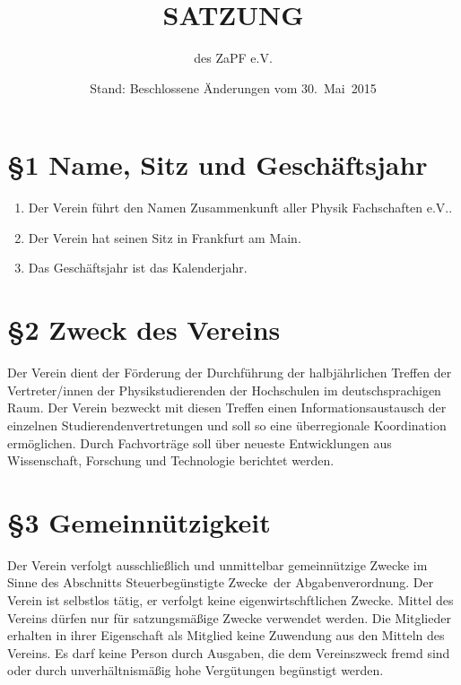 \documentclass[11pt,ngerman]{article}
\begin{document}
\title{SATZUNG}
\date{Stand: Beschlossene Änderungen vom 30.~Mai~2015}

\author{des \textquotedbl{}ZaPF
e.V.\textquotedbl{}}

\maketitle



\section*{§1 Name, Sitz und Geschäftsjahr}
\begin{enumerate}
\item Der Verein führt den Namen \glqq Zusammenkunft aller Physik Fachschaften e.V.\grqq.
\item Der Verein hat seinen Sitz in Frankfurt am Main.
\item Das Geschäftsjahr ist das Kalenderjahr.
\end{enumerate}


\section*{§2 Zweck des Vereins}
Der Verein dient der Förderung der Durchführung der halbjährlichen Treffen der Vertreter/innen der Physikstudierenden der Hochschulen im deutschsprachigen Raum.
Der Verein bezweckt mit diesen Treffen einen Informationsaustausch der einzelnen Studierendenvertretungen und soll so eine überregionale Koordination ermöglichen. Durch Fachvorträge soll über neueste Entwicklungen aus Wissenschaft, Forschung und Technologie berichtet werden.


\section*{§3 Gemeinnützigkeit}
Der Verein verfolgt ausschließlich und unmittelbar gemeinnützige Zwecke im Sinne des Abschnitts \glqq Steuerbegünstigte Zwecke\grqq\ der Abgabenverordnung. Der Verein ist selbstlos tätig, er verfolgt keine eigenwirtschftlichen Zwecke. Mittel des Vereins dürfen nur für satzungsmäßige Zwecke verwendet werden. Die Mitglieder erhalten in
ihrer Eigenschaft als Mitglied keine Zuwendung aus den Mitteln des Vereins. Es darf keine Person durch Ausgaben, die dem Vereinszweck fremd sind oder durch unverhältnismäßig hohe Vergütungen begünstigt werden.
\end{document}
